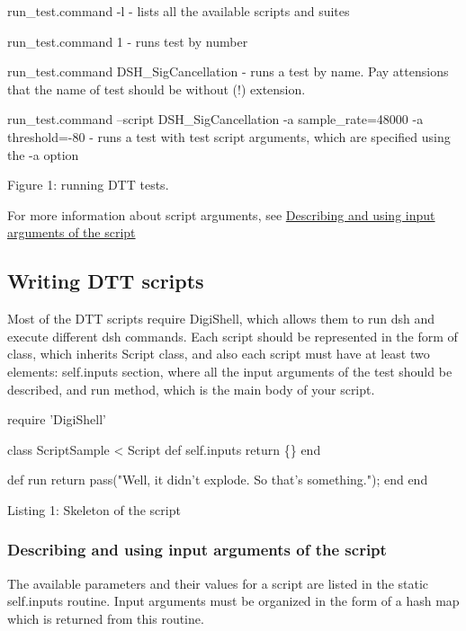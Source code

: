 \begin{DoxyItemize}
\item {\ttfamily run\+\_\+test.\+command -\/l} -\/ lists all the available scripts and suites 
\item {\ttfamily run\+\_\+test.\+command 1} -\/ runs test by number 
\item {\ttfamily run\+\_\+test.\+command D\+S\+H\+\_\+\+Sig\+Cancellation} -\/ runs a test by name. Pay attensions that the name of test should be without (!) extension. 
\item {\ttfamily run\+\_\+test.\+command --script D\+S\+H\+\_\+\+Sig\+Cancellation -\/a sample\+\_\+rate=48000 -\/a threshold=-\/80} -\/ runs a test with test script arguments, which are specified using the {\ttfamily -\/a} option 
\end{DoxyItemize}

 Figure 1\+: running D\+T\+T tests.

For more information about script arguments, see \hyperlink{a00366_describing_and_using_input_arguments_of_the_script}{Describing and using input arguments of the script}



 \hypertarget{a00366_dtt_guide_03_writing_dtt_scripts}{}\subsection{Writing D\+T\+T scripts}\label{a00366_dtt_guide_03_writing_dtt_scripts}
 Most of the D\+T\+T scripts require {\ttfamily Digi\+Shell}, which allows them to run dsh and execute different dsh commands. Each script should be represented in the form of class, which inherits Script class, and also each script must have at least two elements\+: self.\+inputs section, where all the input arguments of the test should be described, and run method, which is the main body of your script.


\begin{DoxyCode}
require \textcolor{stringliteral}{'DigiShell'}

\textcolor{keyword}{class }ScriptSample < Script
   def self.inputs
      return \{\}
   end

   def run
      \textcolor{keywordflow}{return} pass(\textcolor{stringliteral}{"Well, it didn't explode.  So that's something."});
   end
end
\end{DoxyCode}
 Listing 1\+: Skeleton of the script

\hypertarget{a00366_describing_and_using_input_arguments_of_the_script}{}\subsubsection{Describing and using input arguments of the script}\label{a00366_describing_and_using_input_arguments_of_the_script}
 The available parameters and their values for a script are listed in the static {\ttfamily self.\+inputs} routine. Input arguments must be organized in the form of a hash map which is returned from this routine.


